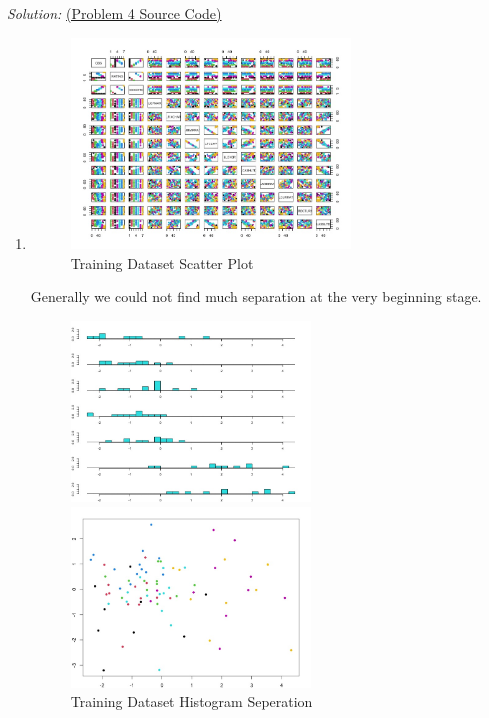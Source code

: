 \documentclass{article}
\newenvironment{solution}
    {\textit{Solution:}}
    {}
\begin{document}
\begin{solution}
\href{run:./src/p4.r}{ (Problem 4 Source Code)}
\begin{enumerate}
\item\mbox{}
	\begin{figure}[h]
		\centering
		\includegraphics[width=0.7\textwidth]{Figure4_General.jpeg}
		\caption{Training Dataset Scatter Plot}
	\end{figure}
\newline
Generally we could not find much separation at the very beginning stage.
\newpage
	\begin{figure}[h]
		\centering
		\includegraphics[width=0.6\textwidth]{Figure4_a_1.jpeg}
		\caption{Training Dataset Histogram Seperation}
		\includegraphics[width=0.6\textwidth]{Figure4_a_2.jpeg}

\end{figure}
\end{enumerate}
\end{solution}
\end{document}
